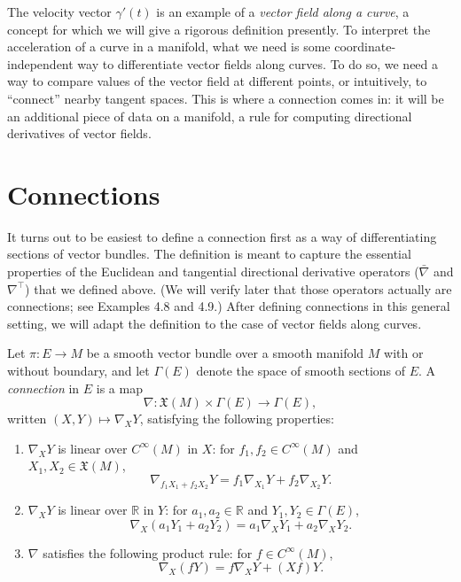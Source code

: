 The velocity vector $\gamma'(t)$ is an example of a \emph{vector field along a curve}, a concept for which we will give a rigorous definition presently. To interpret the acceleration of a curve in a manifold, what we need is some coordinate-independent way to differentiate vector fields along curves. To do so, we need a way to compare values of the vector field at different points, or intuitively, to ``connect'' nearby tangent spaces. This is where a connection comes in: it will be an additional piece of data on a manifold, a rule for computing directional derivatives of vector fields.

\section{Connections}

It turns out to be easiest to define a connection first as a way of differentiating sections of vector bundles. The definition is meant to capture the essential properties of the Euclidean and tangential directional derivative operators ($\bar\nabla$ and $\nabla^\top$) that we defined above. (We will verify later that those operators actually are connections; see Examples 4.8 and 4.9.) After defining connections in this general setting, we will adapt the definition to the case of vector fields along curves.

Let $\pi : E \to M$ be a smooth vector bundle over a smooth manifold $M$ with or without boundary, and let $\Gamma(E)$ denote the space of smooth sections of $E$. A \emph{connection} in $E$ is a map
\[
\nabla: \mathfrak{X}(M) \times \Gamma(E) \to \Gamma(E),
\]
written $(X, Y) \mapsto \nabla_X Y$, satisfying the following properties:
\begin{enumerate}
\item[(i)] $\nabla_X Y$ is linear over $C^\infty(M)$ in $X$: for $f_1, f_2 \in C^\infty(M)$ and $X_1, X_2 \in \mathfrak{X}(M)$,
\[
\nabla_{f_1 X_1 + f_2 X_2} Y = f_1 \nabla_{X_1} Y + f_2 \nabla_{X_2} Y.
\]

\item[(ii)] $\nabla_X Y$ is linear over $\mathbb{R}$ in $Y$: for $a_1, a_2 \in \mathbb{R}$ and $Y_1, Y_2 \in \Gamma(E)$,
\[
\nabla_X(a_1 Y_1 + a_2 Y_2) = a_1 \nabla_X Y_1 + a_2 \nabla_X Y_2.
\]

\item[(iii)] $\nabla$ satisfies the following product rule: for $f \in C^\infty(M)$,
\[
\nabla_X(fY) = f \nabla_X Y + (Xf)Y.
\]
\end{enumerate}

